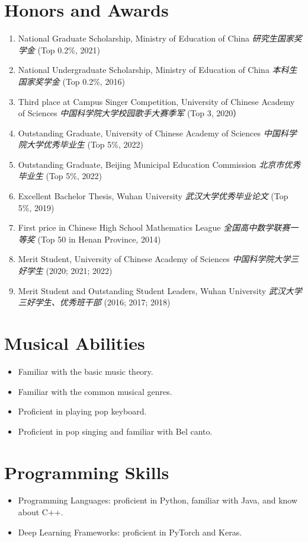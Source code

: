 \documentclass{resume}
\begin{document}
\section{Honors and Awards}
\begin{enumerate}
  \item National Graduate Scholarship, Ministry of Education of China \textit{研究生国家奖学金} (Top 0.2\%, 2021)
  \item National Undergraduate Scholarship, Ministry of Education of China \textit{本科生国家奖学金} (Top 0.2\%, 2016)
  \item Third place at Campus Singer Competition, University of Chinese Academy of Sciences \textit{中国科学院大学校园歌手大赛季军} (Top 3, 2020）
  \item Outstanding Graduate, University of Chinese Academy of Sciences \textit{中国科学院大学优秀毕业生} (Top 5\%, 2022)
  \item Outstanding Graduate, Beijing Municipal Education Commission \textit{北京市优秀毕业生} (Top 5\%, 2022)
  \item Excellent Bachelor Thesis, Wuhan University \textit{武汉大学优秀毕业论文} (Top 5\%, 2019)
  \item First price in Chinese High School Mathematics League \textit{全国高中数学联赛一等奖} (Top 50 in Henan Province, 2014)
  \item Merit Student, University of Chinese Academy of Sciences \textit{中国科学院大学三好学生} (2020; 2021; 2022)
  \item Merit Student and Outstanding Student Leaders, Wuhan University \textit{武汉大学三好学生、优秀班干部} (2016; 2017; 2018)
\end{enumerate}

\section{Musical Abilities}
\begin{itemize}
  \item Familiar with the basic music theory.
  \item Familiar with the common musical genres.
  \item Proficient in playing pop keyboard.
  \item Proficient in pop singing and familiar with Bel canto.
\end{itemize}

\section{Programming Skills}
\begin{itemize}
  \item Programming Languages: proficient in Python, familiar with Java, and know about C++.
  \item Deep Learning Frameworks: proficient in PyTorch and Keras.
\end{itemize}
\end{document}
